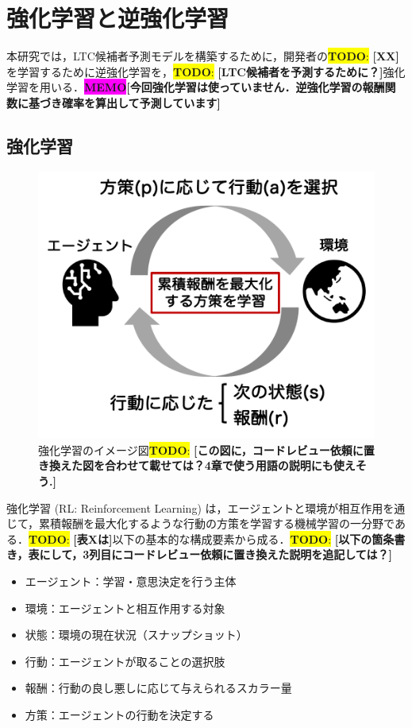 \documentclass[submit,techrep,noauthor]{ipsj}
\newcommand{\todo}[1]{\colorbox{yellow}{{\bf TODO}:}{\color{red} {\textbf{[#1]}}}}
\newcommand{\memo}[1]{\colorbox{magenta}{\textbf{MEMO}}{\color{red}\textbf{[#1]}}}
\begin{document}
\label{sec:ml}
\section{強化学習と逆強化学習}

本研究では，LTC候補者予測モデルを構築するために，開発者の\todo{XX}を学習するために逆強化学習を，\todo{LTC候補者を予測するために？}強化学習を用いる．\memo{今回強化学習は使っていません．逆強化学習の報酬関数に基づき確率を算出して予測しています}

\subsection{強化学習}
\begin{figure}[h]
    \centering
    \includegraphics[width=1.0\linewidth]{./Hashimoto_fig/RL.pdf}
    \caption{強化学習のイメージ図\todo{この図に，コードレビュー依頼に置き換えた図を合わせて載せては？4章で使う用語の説明にも使えそう.}}
    \label{fig:RL}
\end{figure}


強化学習 (RL: Reinforcement Learning) は，エージェントと環境が相互作用を通じて，累積報酬を最大化するような行動の方策を学習する機械学習の一分野である．\todo{表Xは}以下の基本的な構成要素から成る．\todo{以下の箇条書き，表にして，3列目にコードレビュー依頼に置き換えた説明を追記しては？}
\begin{itemize}
    \item エージェント：学習・意思決定を行う主体
    \item 環境：エージェントと相互作用する対象
    \item 状態：環境の現在状況（スナップショット）
    \item 行動：エージェントが取ることの選択肢
    \item 報酬：行動の良し悪しに応じて与えられるスカラー量
    \item 方策：エージェントの行動を決定する
\end{itemize}
\end{document}
